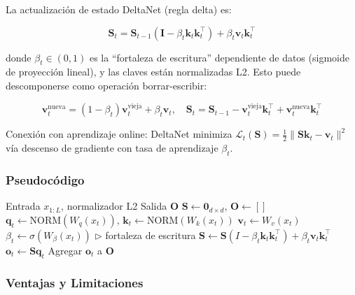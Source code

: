 \documentclass[11pt,a4paper]{article}
\begin{document}
La actualización de estado DeltaNet (regla delta) es:

\begin{equation}
\mathbf{S}_t = \mathbf{S}_{t-1}(\mathbf{I} - \beta_t \mathbf{k}_t \mathbf{k}_t^\top) + \beta_t \mathbf{v}_t \mathbf{k}_t^\top
\end{equation}

donde $\beta_t \in (0,1)$ es la ``fortaleza de escritura'' dependiente de datos (sigmoide de proyección lineal), y las claves están normalizadas L2. Esto puede descomponerse como operación borrar-escribir:

\begin{equation}
\mathbf{v}_t^{\text{nueva}} = (1 - \beta_t)\mathbf{v}_t^{\text{vieja}} + \beta_t \mathbf{v}_t, \quad \mathbf{S}_t = \mathbf{S}_{t-1} - \mathbf{v}_t^{\text{vieja}} \mathbf{k}_t^\top + \mathbf{v}_t^{\text{nueva}} \mathbf{k}_t^\top
\end{equation}

Conexión con aprendizaje online: DeltaNet minimiza $\mathcal{L}_t(\mathbf{S}) = \frac{1}{2}\|\mathbf{S}\mathbf{k}_t - \mathbf{v}_t\|^2$ vía descenso de gradiente con tasa de aprendizaje $\beta_t$.

\subsubsection{Pseudocódigo}

\begin{algorithm}
\caption{DeltaNet - Regla Delta para Atención Lineal}
\begin{algorithmic}[1]
\Require Entrada $x_{1:L}$, normalizador L2
\Ensure Salida $\mathbf{O}$
\State $\mathbf{S} \gets \mathbf{0}_{d \times d}$, $\mathbf{O} \gets []$
    \State $\mathbf{q}_t \gets \text{NORM}(W_q(x_t))$, $\mathbf{k}_t \gets \text{NORM}(W_k(x_t))$
    \State $\mathbf{v}_t \gets W_v(x_t)$
    \State $\beta_t \gets \sigma(W_\beta(x_t))$ \quad $\triangleright$ fortaleza de escritura
    \State $\mathbf{S} \gets \mathbf{S}(I - \beta_t \mathbf{k}_t \mathbf{k}_t^\top) + \beta_t \mathbf{v}_t \mathbf{k}_t^\top$
    \State $\mathbf{o}_t \gets \mathbf{S} \mathbf{q}_t$
    \State Agregar $\mathbf{o}_t$ a $\mathbf{O}$
\EndFor
\end{algorithmic}
\end{algorithm}

\subsubsection{Ventajas y Limitaciones}
\end{document}
